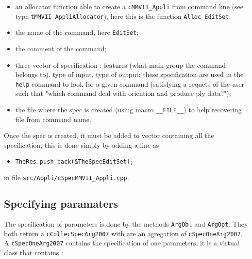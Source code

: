 \documentclass[a4paper]{book}
\begin{document}
{\begin{itemize}
   \item an allocator function able to create a {\tt cMMVII\_Appli} from command line
         (see type {\tt tMMVII\_AppliAllocator}), here this is the function {\tt Alloc\_EditSet};

   \item the name of the command, here {\tt EditSet};

   \item the comment of the command;

   \item three vector of specification : features (what main group the command belongs to), type
         of input, type of output;  these specification are used in the {\tt help} command to 
         look for a given command (satisfying a requets of the user such that "which command deal with oriention
         and produce ply data?");

   \item the file where the spec is created (using macro {\tt \_\_FILE\_\_}) to help recovering file from 
         command name.
\end{itemize}

Once the spec is created, it must be added to vector containing all the 
specification, this is done simply by adding a line as 
\begin{itemize}
   \item {\tt  TheRes.push\_back(\&TheSpecEditSet);} 
\end{itemize}

in file {\tt src/Appli/cSpecMMVII\_Appli.cpp}.



\subsection{Specifying paramaters}


The specification of parameters is done by the methods {\tt ArgObl} and {\tt ArgOpt}.
They both return a {\tt cCollecSpecArg2007} with are an agregation of {\tt cSpecOneArg2007}.
A {\tt cSpecOneArg2007} contains the specification of one parameters, it is
a virtual class that contains :

}
\end{document}
